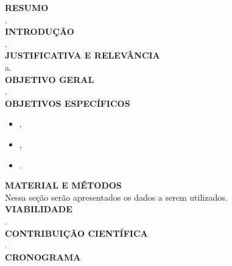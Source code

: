 \documentclass[portuguese,12pt,a4paper]{article}
\begin{document}
 

	

\newpage
{}
\textbf{RESUMO}\\

.\\

\textbf{INTRODUÇÃO} \\
.
 \\


\textbf{JUSTIFICATIVA E RELEVÂNCIA } \\

a. \\

\textbf{OBJETIVO GERAL} \\ 
. \\

\textbf{OBJETIVOS ESPECÍFICOS} 

\begin{itemize}
\item  ,

\item  ,

\item . 
\end{itemize}

\textbf{MATERIAL E MÉTODOS} \\

Nessa seção serão apresentados os dados a serem utilizados. \\



\textbf{VIABILIDADE} \\ 

. \\

\textbf{CONTRIBUIÇÃO CIENTÍFICA} \\

. \\

\textbf{CRONOGRAMA} \\
\end{document}
